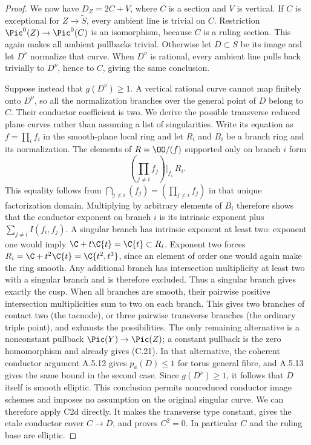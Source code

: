 \begin{proof}
We now have $D_Z=2C+V$, where $C$ is a section and $V$ is vertical. If $C$ is exceptional for $Z\to\widetilde S$, every ambient line is trivial on $C$. Restriction $\Pic^0(Z)\to\Pic^0(C)$ is an isomorphism, because $C$ is a ruling section. This again makes all ambient pullbacks trivial. Otherwise let $D\subset S$ be its image and let $D^\nu$ normalize that curve. When $D^\nu$ is rational, every ambient line pulls back trivially to $D^\nu$, hence to $C$, giving the same conclusion.

Suppose instead that $g(D^\nu)\ge1$. A vertical rational curve cannot map finitely onto $D^\nu$, so all the normalization branches over the general point of $D$ belong to $C$. Their conductor coefficient is two. We derive the possible transverse reduced plane curves rather than assuming a list of singularities. Write its equation as $f=\prod_i f_i$ in the smooth-plane local ring and let $R_i$ and $B_i$ be a branch ring and its normalization. The elements of $R=\OO/(f)$ supported only on branch $i$ form
\[
 \left(\prod_{j\ne i}f_j\right)\bigg|_{f_i}\,R_i.
\]
This equality follows from
$\bigcap_{j\ne i}(f_j)=(\prod_{j\ne i}f_j)$ in that unique
factorization domain. Multiplying by arbitrary elements of
$B_i$ therefore shows that the conductor exponent on branch $i$
is its intrinsic exponent plus $\sum_{j\ne i}I(f_i,f_j)$.
A singular branch has intrinsic exponent at least two:
exponent one would imply $\C+t\C\{t\}=\C\{t\}\subset R_i$.
Exponent two forces $R_i=\C+t^2\C\{t\}=\C\{t^2,t^3\}$,
since an element of order one would again make the ring smooth.
Any additional branch has intersection multiplicity at least
two with a singular branch and is therefore excluded. Thus a
singular branch gives exactly the cusp. When all branches are
smooth, their pairwise positive intersection multiplicities sum
to two on each branch. This gives two branches of contact two
(the tacnode), or three pairwise transverse branches (the
ordinary triple point), and exhausts the possibilities.
The only remaining alternative is a nonconstant pullback
$\Pic(Y)\to\Pic(Z)$; a constant pullback is the zero
homomorphism and already gives (C.21). In that alternative,
the coherent conductor argument A.5.12 gives $p_a(D)\le1$
for torus general fibre, and A.5.13 gives the same bound
in the second case.
Since $g(D^\nu)\ge1$, it follows that $D$ itself is smooth
elliptic. This conclusion permits nonreduced conductor image
schemes and imposes no assumption on the original singular
curve. We can therefore apply C2d directly. It makes the
transverse type constant, gives the etale conductor cover
$C\to D$, and proves $C^2=0$. In particular $C$ and the
ruling base are elliptic.


\end{proof}
